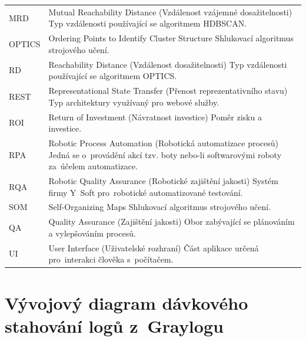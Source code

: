 \begin{longtable}{p{2cm}p{12.2cm}}
MRD & Mutual Reachability Distance (Vzdálenost vzájemné dosažitelnosti)\newline
Typ vzdálenosti používající se algoritmem HDBSCAN.\\

OPTICS & Ordering Points to Identify Cluster Structure\newline
Shlukovací algoritmus strojového učení.\\

RD & Reachability Distance (Vzdálenost dosažitelnosti)\newline
Typ vzdálenosti používající se algoritmem OPTICS.\\

REST & Representational State Transfer (Přenost reprezentativního stavu)\newline
Typ architektury využívaný pro webové služby.\\

ROI & Return of Investment (Návratnost investice)\newline
Poměr zisku a investice.\\

RPA & Robotic Process Automation (Robotická automatizace procesů)\newline
Jedná se o~provádění akcí tzv. boty nebo-li softwarovými roboty za~účelem automatizace.\\

RQA & Robotic Quality Assurance (Robotické zajištění jakosti)\newline
Systém firmy Y~Soft pro~robotické automatizované testování.\\

SOM & Self-Organizing Maps\newline
Shlukovací algoritmus strojového učení.\\
   
QA & Quality Assurance (Zajištění jakosti)\newline
Obor zabývající se plánováním a vylepšováním procesů.\\

UI & User Interface (Uživatelské rozhraní)\newline
Část aplikace určená pro~interakci člověka s~počítačem.\\
   
\end{longtable}

\chapter{Vývojový diagram dávkového stahování logů z~Graylogu}
\label{priloha-C}

